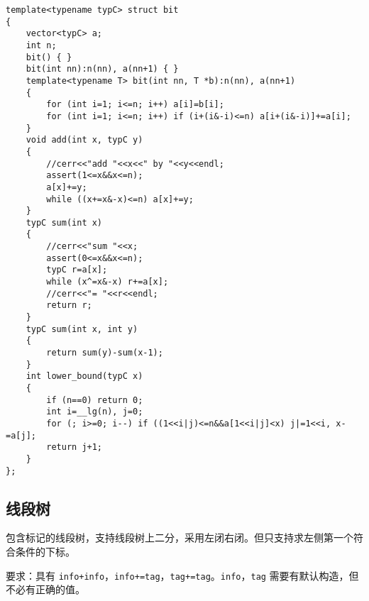 \documentclass[12pt]{ctexart}
\begin{document}
\begin{lstlisting}
template<typename typC> struct bit
{
	vector<typC> a;
	int n;
	bit() { }
	bit(int nn):n(nn), a(nn+1) { }
	template<typename T> bit(int nn, T *b):n(nn), a(nn+1)
	{
		for (int i=1; i<=n; i++) a[i]=b[i];
		for (int i=1; i<=n; i++) if (i+(i&-i)<=n) a[i+(i&-i)]+=a[i];
	}
	void add(int x, typC y)
	{
		//cerr<<"add "<<x<<" by "<<y<<endl;
		assert(1<=x&&x<=n);
		a[x]+=y;
		while ((x+=x&-x)<=n) a[x]+=y;
	}
	typC sum(int x)
	{
		//cerr<<"sum "<<x;
		assert(0<=x&&x<=n);
		typC r=a[x];
		while (x^=x&-x) r+=a[x];
		//cerr<<"= "<<r<<endl;
		return r;
	}
	typC sum(int x, int y)
	{
		return sum(y)-sum(x-1);
	}
	int lower_bound(typC x)
	{
		if (n==0) return 0;
		int i=__lg(n), j=0;
		for (; i>=0; i--) if ((1<<i|j)<=n&&a[1<<i|j]<x) j|=1<<i, x-=a[j];
		return j+1;
	}
};
\end{lstlisting}

\subsection{线段树}

包含标记的线段树，支持线段树上二分，采用左闭右闭。但只支持求左侧第一个符合条件的下标。

要求：具有 \verb|info+info|，\verb|info+=tag|，\verb|tag+=tag|。\verb|info|，\verb|tag| 需要有默认构造，但不必有正确的值。
\end{document}
